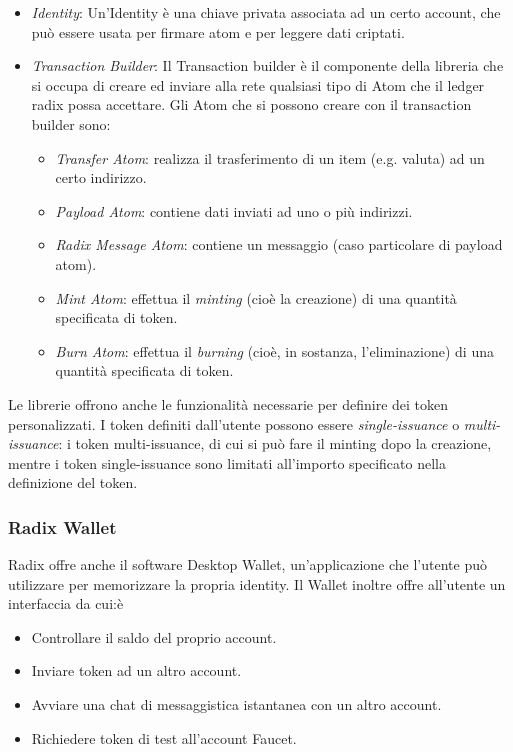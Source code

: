 \begin{itemize}
    \item \textit{Identity}: Un'Identity è una chiave privata associata ad un certo account, che può essere usata per firmare atom e per leggere dati criptati.
    \item \textit{Transaction Builder}: Il Transaction builder è il componente della libreria che si occupa di creare ed inviare alla rete qualsiasi tipo di Atom che il ledger radix possa accettare. Gli Atom che si possono creare con il transaction builder sono:
    \begin{itemize}
        \item \textit{Transfer Atom}: realizza il trasferimento di un item (e.g. valuta) ad un certo indirizzo.
        \item \textit{Payload Atom}: contiene dati inviati ad uno o più indirizzi.
        \item \textit{Radix Message Atom}: contiene un messaggio (caso particolare di payload atom).
        \item \textit{Mint Atom}: effettua il \textit{minting} (cioè la creazione) di una quantità specificata di token.
        \item \textit{Burn Atom}: effettua il \textit{burning} (cioè, in sostanza, l'eliminazione) di una quantità specificata di token.
    \end{itemize}
\end{itemize}
Le librerie offrono anche le funzionalità necessarie per definire dei token personalizzati. I token definiti dall'utente possono essere \textit{single-issuance} o \textit{multi-issuance}: i token multi-issuance, di cui si può fare il minting dopo la creazione, mentre i token single-issuance sono limitati all'importo specificato nella definizione del token.

\subsubsection{Radix Wallet}

Radix offre anche il software Desktop Wallet, un'applicazione che l'utente può utilizzare per memorizzare la propria identity. Il Wallet inoltre offre all'utente un interfaccia da cui:è
\begin{itemize}
    \item Controllare il saldo del proprio account.
    \item Inviare token ad un altro account.
    \item Avviare una chat di messaggistica istantanea con un altro account.
    \item Richiedere token di test all'account Faucet.
\end{itemize}
